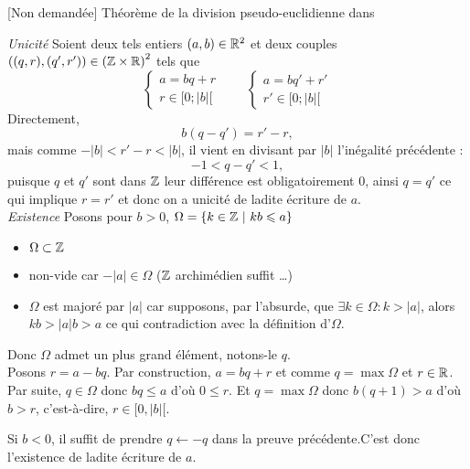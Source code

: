 \documentclass{article}
\renewenvironment{question_kholle}[2][ ]
{
	\subsection{\texorpdfstring{#2}{}}
	\notblank{#1}
	{
		\noindent #1
		\bigbreak
	}
	{}
	\begin{proof}
}
{
	\end{proof}
}
\begin{document}
\begin{question_kholle}
	[
		\begin{equation}
			\forall (a, b) \in \R \times \R^*,
			\exists ! (q, r) \in \Z \times \R :
			\left\{
			\begin{matrix}
				a = b q + r \\
				r \in [0;|b|[
			\end{matrix} \right.
		\end{equation}]
	{[Non demandée] Théorème de la division
		pseudo-euclidienne dans \R}

	\textit{Unicité} \;
	Soient deux tels entiers $(a,b) \in \mathbb R^2$ et deux
	couples $((q,r),(q',r')) \in \left(\mathbb Z \times
		\mathbb R\right)^2$ tels que
	\begin{equation*}
		\left\{
		\begin{matrix}
			a = b q + r \\
			r \in [0;|b|[
		\end{matrix} \right.
		\qquad
		\left\{
		\begin{matrix}
			a = b q' + r' \\
			r' \in [0;|b|[
		\end{matrix} \right.
	\end{equation*}
	Directement,
	\[
		b(q-q') = r'-r,
	\]
	mais comme $-|b| < r' - r < |b|$, il
	vient en divisant par $|b|$ l'inégalité précédente :
	\[
		-1 < q - q' < 1,
	\]
	puisque $q$ et $q'$ sont dans $\mathbb Z$ leur
	différence est obligatoirement $0$, ainsi
	$q = q'$ ce qui implique $ r= r'$ et donc
	on a unicité de ladite écriture de $a$.
	\newline
	\\
	\textit{Existence} \; Posons pour $b >
		0$, $\Omega = \{ k\in \mathbb Z  \ | \ kb \leqslant a \}$
	\begin{itemize}
		\item $\Omega \subset \mathbb Z$
		\item non-vide car $-|a| \in \Omega$
		      ($\mathbb Z$ archimédien suffit \ldots)
		\item $\Omega$ est majoré par $|a|$ car
		      supposons, par l'absurde, que
		      $\exists k \in \Omega : k > |a|$,
		      alors $kb > |a|b > a$ ce qui
		      contradiction avec la définition d'$\Omega$.
	\end{itemize}
	Donc $\Omega$ admet un plus grand
	élément, notons-le $q$. \\
	Posons $r = a - bq$. Par construction, $a
		= bq + r$ et comme $q = \max \Omega$ et $r \in \mathbb R$.
	\\
	Par suite, $q \in \Omega$ donc $bq
		\leqslant a$ d'où $0 \leqslant r$. Et $q
		= \max \Omega$ donc $b(q+1) > a$ d'où $b
		> r$, c'est-à-dire, $r \in [ 0, |b| [$.

	Si $b < 0$, il suffit de prendre $q
		\leftarrow -q$ dans la preuve
	précédente.C'est donc l'existence de
	ladite écriture de $a$.
\end{question_kholle}
\end{document}
